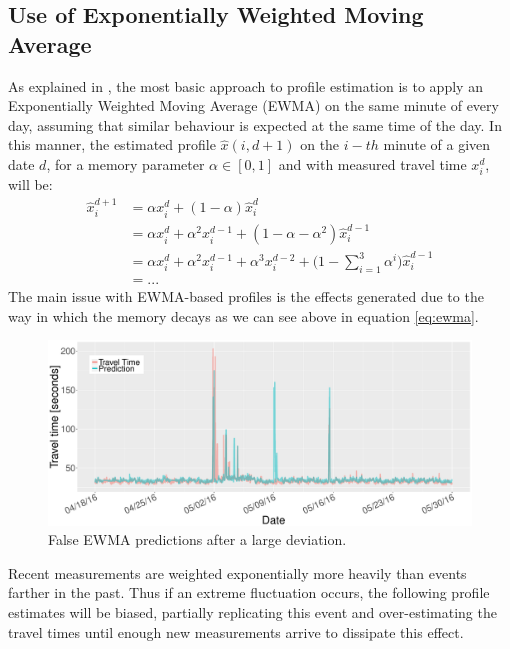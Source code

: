 \documentclass[a4paper, 10pt, conference]{ieeeconf}      %
\begin{document}
\subsection{Use of Exponentially Weighted Moving Average} \label{ewma}
As explained in \cite{ttprofiles}, the most basic approach to profile estimation is to apply an Exponentially Weighted Moving Average (EWMA) on the same minute of every day, assuming that similar behaviour is expected at the same time of the day. 
In this manner, the estimated profile $\hat{x}(i,d+1)$ on the $i-th$ minute of a given date $d$, for a memory parameter $\alpha \in [0,1]$ and with measured travel time $x_i^d$, will be:
\begin{equation}
\begin{aligned}
\hat{x}^{d+1}_i \!&= \alpha  x^{d}_{i} + (1-\alpha)\hat{x}^{d}_{i} \\ 
&= \alpha  x^{d}_{i} + \alpha^2  x^{d-1}_{i} + (1-\alpha - \alpha^2) \hat{x}^{d-1}_{i}\\ 
&= \alpha  x^{d}_{i} + \alpha^2  x^{d-1}_{i} + \alpha^3  x^{d-2}_{i}\! +\! \bigg( 1\!-\!\sum_{i=1}^{3} \alpha^i \bigg) \hat{x}^{d-1}_{i}\\
&= ...
\end{aligned}
\label{eq:ewma}
\end{equation}
The main issue with EWMA-based profiles is the effects generated due to the way in which the memory decays as we can see above in equation \ref{eq:ewma}.
\begin{figure}[htbp]
	\centerline{\includegraphics[width=\linewidth]{./images/EWMA.pdf}}
	\caption{False EWMA predictions after a large deviation.}
	\label{fig:EWMA}
\end{figure}
Recent measurements are weighted exponentially more heavily than events farther in the past. 
Thus if an extreme fluctuation occurs, the following profile estimates will be biased, partially replicating this event and over-estimating the travel times until enough new measurements arrive to dissipate this effect.
\end{document}

